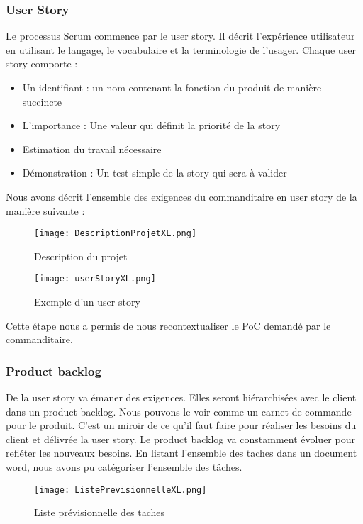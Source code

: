 \subsubsection{User Story}
Le processus Scrum commence par le user story. Il décrit l’expérience utilisateur en utilisant le langage, le vocabulaire et la terminologie de l’usager.   
Chaque user story comporte : 

\begin{itemize}
    \item Un identifiant : un nom contenant la fonction du produit de manière succincte  
    \item L’importance : Une valeur qui définit la priorité de la story  
    \item Estimation du travail nécessaire
    \item Démonstration : Un test simple de la story qui sera à valider   
\end{itemize}

Nous avons décrit l’ensemble des exigences du commanditaire en user story de la manière suivante : 

\begin{figure}[h!]
  \centering
  \texttt{[image: DescriptionProjetXL.png]}
	\caption[]{Description du projet}
	\label{}
\end{figure}

\begin{figure}[h!]
  \centering
  \texttt{[image: userStoryXL.png]}
	\caption[]{Exemple d’un user story}
	\label{}
\end{figure}

Cette étape nous a permis de nous recontextualiser le PoC demandé par le commanditaire. 


\subsubsection{Product backlog}
De la user story va émaner des exigences. Elles seront hiérarchisées avec le client dans un product backlog. Nous pouvons le voir comme un carnet de commande pour le produit. C’est un miroir de ce qu’il faut faire pour réaliser les besoins du client et délivrée la user story.  
Le product backlog va constamment évoluer pour refléter les nouveaux besoins. 
En listant l’ensemble des taches dans un document word, nous avons pu catégoriser l’ensemble des tâches.

\begin{figure}[h!]
  \centering
  \texttt{[image: ListePrevisionnelleXL.png]}
	\caption[]{Liste prévisionnelle des taches}
	\label{}
\end{figure}

